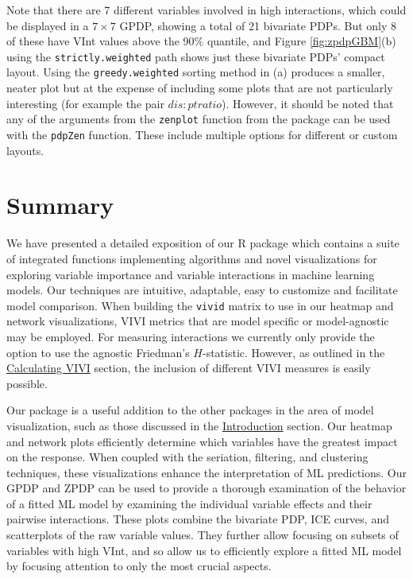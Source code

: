 Note that there are 7 different variables involved in high interactions, which could be displayed in a \(7 \times 7\) GPDP, showing a total of 21 bivariate PDPs. But only 8 of these have VInt values above the 90\% quantile, and Figure \ref{fig:zpdpGBM}(b) using the \texttt{strictly.weighted} path shows just these bivariate PDPs' compact layout. Using the \texttt{greedy.weighted} sorting method in (a) produces a smaller, neater plot but at the expense of including some plots that are not particularly interesting (for example the pair \(dis:ptratio\)). However, it should be noted that any of the arguments from the \texttt{zenplot} function from the  package can be used with the \texttt{pdpZen} function. These include multiple options for different or custom layouts.

\hypertarget{summary}{%
\section{Summary}\label{summary}}

We have presented a detailed exposition of our R package  which contains a suite of integrated functions implementing algorithms and novel visualizations for exploring variable importance and variable interactions in machine learning models. Our techniques are intuitive, adaptable, easy to customize and facilitate model comparison. When building the \texttt{vivid} matrix to use in our heatmap and network visualizations, VIVI metrics that are model specific or model-agnostic may be employed. For measuring interactions we currently only provide the option to use the agnostic Friedman's \(H\)-statistic. However, as outlined in the \protect\hyperlink{data}{Calculating VIVI} section, the inclusion of different VIVI measures is easily possible.

Our  package is a useful addition to the other packages in the area of model visualization, such as those discussed in the \protect\hyperlink{introduction}{Introduction} section. Our heatmap and network plots efficiently determine which variables have the greatest impact on the response. When coupled with the seriation, filtering, and clustering techniques, these visualizations enhance the interpretation of ML predictions. Our GPDP and ZPDP can be used to provide a thorough examination of the behavior of a fitted ML model by examining the individual variable effects and their pairwise interactions. These plots combine the bivariate PDP, ICE curves, and scatterplots of the raw variable values. They further allow focusing on subsets of variables with high VInt, and so allow us to efficiently explore a fitted ML model by focusing attention to only the most crucial aspects.

